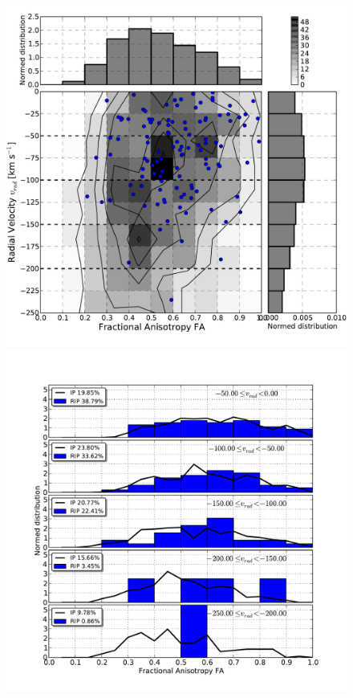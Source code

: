 \documentclass[a4,useAMS,usenatbib,usegraphicx]{latex/mn2e}
\begin{document}
\begin{flushleft}
\begin{figure}
\begin{center}

  \includegraphics[trim = 2mm 9mm 3mm 4mm, clip, keepaspectratio=true,
  width=0.36\textheight]{./figures/2D_radialvelocity_FA_BDM_Tweb}
  \includegraphics[trim = 4mm 9mm 17mm 15mm, clip, keepaspectratio=true,
  width=0.36\textheight]{./figures/single_radialvelocity_FA_BDM_Tweb}
  

\end{center}
\end{figure}
\end{flushleft}
\end{document}
